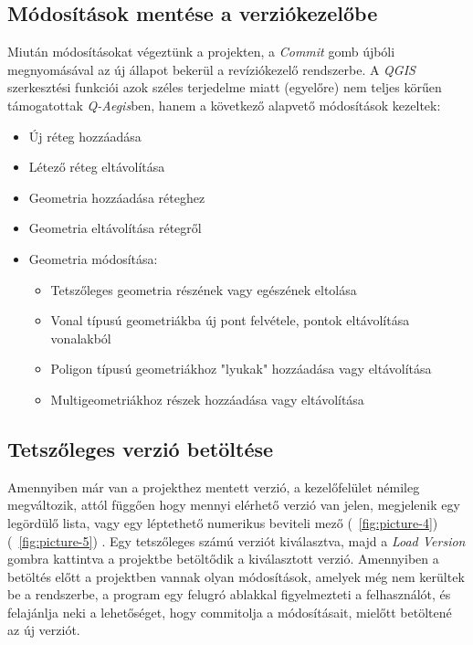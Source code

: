 \subsection{Módosítások mentése a verziókezelőbe}
Miután módosításokat végeztünk a projekten, a \emph{Commit} gomb újbóli megnyomásával az új állapot bekerül a revíziókezelő rendszerbe. A \emph{QGIS} szerkesztési funkciói azok széles terjedelme miatt (egyelőre) nem teljes körűen támogatottak \emph{Q-Aegis}ben, hanem a következő alapvető módosítások kezeltek:
\begin{itemize}
	\item Új réteg hozzáadása
	\item Létező réteg eltávolítása
	\item Geometria hozzáadása réteghez
	\item Geometria eltávolítása rétegről
	\item Geometria módosítása:
	\begin{itemize}
		\item Tetszőleges geometria részének vagy egészének eltolása
		\item Vonal típusú geometriákba új pont felvétele, pontok eltávolítása vonalakból
		\item Poligon típusú geometriákhoz "lyukak" hozzáadása vagy eltávolítása
		\item Multigeometriákhoz részek hozzáadása vagy eltávolítása
	\end{itemize}	
\end{itemize}

\subsection{Tetszőleges verzió betöltése}
Amennyiben már van a projekthez mentett verzió, a kezelőfelület némileg megváltozik, attól függően hogy mennyi elérhető verzió van jelen, megjelenik egy legördülő lista, vagy egy léptethető numerikus beviteli mező (~\ref{fig:picture-4}) (~\ref{fig:picture-5}) . Egy tetszőleges számú verziót kiválasztva, majd a \textit{Load Version} gombra kattintva a projektbe betöltődik a kiválasztott verzió. Amennyiben a betöltés előtt a projektben vannak olyan módosítások, amelyek még nem kerültek be a rendszerbe, a program egy felugró ablakkal figyelmezteti a felhasználót, és felajánlja neki a lehetőséget, hogy commitolja a módosításait, mielőtt betöltené az új verziót.

